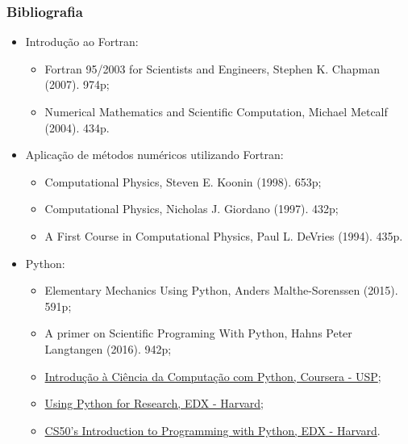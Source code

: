 \documentclass[xcolor=table]{beamer}
\newenvironment{stepitemize}{\begin{itemize}[<+->]}{\end{itemize} }
\begin{document}
\begin{frame}%

\frametitle{Bibliografia}

\begin{stepitemize}
\item Introdu\c{c}\~{a}o ao Fortran:

\begin{itemize}
\item Fortran 95/2003 for Scientists and Engineers, Stephen K. Chapman
(2007). 974p;

\item Numerical Mathematics and Scientific Computation, Michael Metcalf
(2004). 434p.
\end{itemize}

\item Aplica\c{c}\~{a}o de m\'{e}todos num\'{e}ricos utilizando Fortran:

\begin{itemize}
\item Computational Physics, Steven E. Koonin (1998). 653p;

\item Computational Physics, Nicholas J. Giordano (1997). 432p;

\item A First Course in Computational Physics, Paul L. DeVries (1994). 435p.
\end{itemize}

\item Python:

\begin{itemize}
\item Elementary Mechanics Using Python, Anders Malthe-Sorenssen (2015). 591p;

\item A primer on Scientific Programing With Python, Hahns Peter Langtangen
(2016). 942p;

\item \href{https://www.coursera.org/learn/ciencia-computacao-python-conceitos}{Introdu\c{c}\~{a}o \`{a} Ci\^{e}ncia da Computa\c{c}\~{a}o com Python,
	Coursera - USP};

\item \href{https://www.edx.org/course/using-python-for-research}{Using Python for Research, EDX - Harvard};

\item \href{https://www.edx.org/course/cs50s-introduction-to-programming-with-python}{CS50's Introduction to Programming with Python, EDX - Harvard}.
\end{itemize}
\end{stepitemize}

\transboxout%
\end{frame}%
\end{document}
